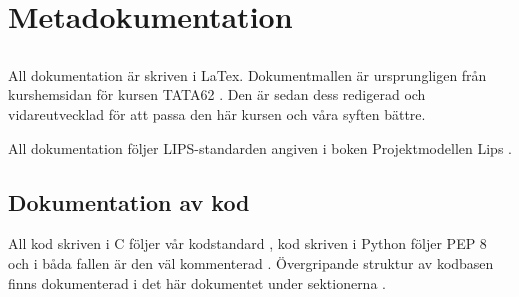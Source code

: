 
\section{Metadokumentation}

\subsection{}

All dokumentation är skriven i LaTex. Dokumentmallen är ursprungligen från kurshemsidan för kursen TATA62 . Den är sedan dess redigerad och vidareutvecklad för att passa den här kursen och våra syften bättre.

All dokumentation följer LIPS-standarden angiven i boken Projektmodellen Lips .

\subsection{Dokumentation av kod}

All kod skriven i C följer vår kodstandard , kod skriven i Python följer PEP 8 och i båda fallen är den väl kommenterad . Övergripande struktur av kodbasen finns dokumenterad i det här dokumentet under sektionerna .
